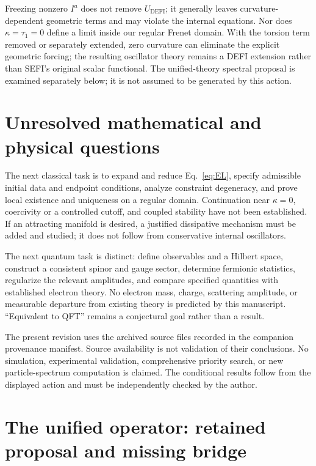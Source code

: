 \documentclass[aip,jmp,reprint,onecolumn,amsmath,amssymb]{revtex4-2}
\newcommand{\U}{U_{\mathrm{DEFI}}}
\begin{document}
Freezing nonzero $I^a$ does not remove $\U$; it generally leaves curvature-dependent geometric terms and may violate the internal equations. Nor does $\kappa=\tau_1=0$ define a limit inside our regular Frenet domain. With the torsion term removed or separately extended, zero curvature can eliminate the explicit geometric forcing; the resulting oscillator theory remains a DEFI extension rather than SEFI's original scalar functional. The unified-theory spectral proposal is examined separately below; it is not assumed to be generated by this action.

\section{Unresolved mathematical and physical questions}
The next classical task is to expand and reduce Eq.~\eqref{eq:EL}, specify admissible initial data and endpoint conditions, analyze constraint degeneracy, and prove local existence and uniqueness on a regular domain. Continuation near $\kappa=0$, coercivity or a controlled cutoff, and coupled stability have not been established. If an attracting manifold is desired, a justified dissipative mechanism must be added and studied; it does not follow from conservative internal oscillators.

The next quantum task is distinct: define observables and a Hilbert space, construct a consistent spinor and gauge sector, determine fermionic statistics, regularize the relevant amplitudes, and compare specified quantities with established electron theory. No electron mass, charge, scattering amplitude, or measurable departure from existing theory is predicted by this manuscript. ``Equivalent to QFT'' remains a conjectural goal rather than a result.

The present revision uses the archived source files recorded in the companion provenance manifest. Source availability is not validation of their conclusions. No simulation, experimental validation, comprehensive priority search, or new particle-spectrum computation is claimed. The conditional results follow from the displayed action and must be independently checked by the author.

\section{The unified operator: retained proposal and missing bridge}
\end{document}
